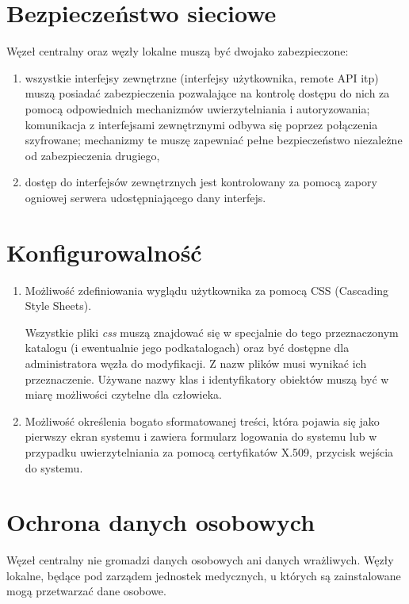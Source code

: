 \documentclass[a4paper]{report}
\begin{document}
\section{Bezpieczeństwo sieciowe}
Węzeł centralny oraz węzły lokalne muszą być dwojako zabezpieczone:
\begin{enumerate}
\item wszystkie interfejsy zewnętrzne (interfejsy użytkownika, remote API itp) muszą posiadać zabezpieczenia
pozwalające na kontrolę dostępu do nich za pomocą odpowiednich mechanizmów uwierzytelniania i autoryzowania;
komunikacja z interfejsami zewnętrznymi odbywa się poprzez połączenia szyfrowane; mechanizmy te muszę zapewniać pełne bezpieczeństwo niezależne od zabezpieczenia drugiego,
\item dostęp do interfejsów zewnętrznych jest kontrolowany za pomocą zapory ogniowej serwera udostępniającego
dany interfejs.
\end{enumerate}

\section{Konfigurowalność}

\begin{enumerate}
  \item Możliwość zdefiniowania wyglądu użytkownika za pomocą CSS (Cascading Style Sheets).

  Wszystkie pliki \emph{css} muszą znajdować się w specjalnie do tego przeznaczonym katalogu (i ewentualnie
  jego podkatalogach) oraz być dostępne dla administratora węzła do modyfikacji. Z nazw plików musi wynikać
  ich przeznaczenie. Używane nazwy klas i identyfikatory obiektów muszą być w miarę możliwości czytelne
  dla człowieka.

  \item Możliwość określenia bogato sformatowanej treści, która pojawia się jako pierwszy ekran systemu
  i zawiera formularz logowania do systemu lub w przypadku uwierzytelniania za pomocą certyfikatów X.509,
  przycisk wejścia do systemu.

\end{enumerate}

\section{Ochrona danych osobowych}

Węzeł centralny nie gromadzi danych osobowych ani danych wrażliwych. Węzły lokalne,
będące pod zarządem jednostek medycznych, u których są zainstalowane mogą
przetwarzać dane osobowe.
\end{document}
